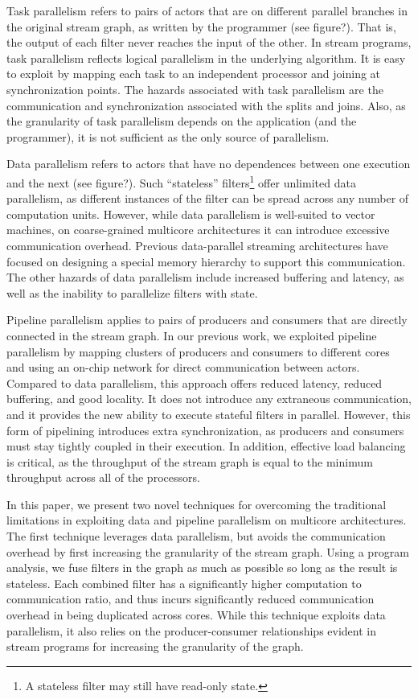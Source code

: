Task parallelism refers to pairs of actors that are on different
parallel branches in the original stream graph, as written by the
programmer (see figure?).  That is, the output of each filter never
reaches the input of the other.  In stream programs, task parallelism
reflects logical parallelism in the underlying algorithm.  It is easy
to exploit by mapping each task to an independent processor and
joining at synchronization points.  The hazards associated with task
parallelism are the communication and synchronization associated with
the splits and joins.  Also, as the granularity of task parallelism
depends on the application (and the programmer), it is not sufficient
as the only source of parallelism.

Data parallelism refers to actors that have no dependences between one
execution and the next (see figure?).  Such ``stateless''
filters\footnote{A stateless filter may still have read-only state.}
offer unlimited data parallelism, as different instances of the filter
can be spread across any number of computation units.  However, while
data parallelism is well-suited to vector machines, on coarse-grained
multicore architectures it can introduce excessive communication
overhead.  Previous data-parallel streaming architectures have focused
on designing a special memory hierarchy to support this
communication\cite{imagine}.  The other hazards of data parallelism
include increased buffering and latency, as well as the inability to
parallelize filters with state.

Pipeline parallelism applies to pairs of producers and consumers that
are directly connected in the stream graph.  In our previous work, we
exploited pipeline parallelism by mapping clusters of producers and
consumers to different cores and using an on-chip network for direct
communication between actors\cite{gordon02asplos}.  Compared to data
parallelism, this approach offers reduced latency, reduced buffering,
and good locality.  It does not introduce any extraneous
communication, and it provides the new ability to execute stateful
filters in parallel.  However, this form of pipelining introduces
extra synchronization, as producers and consumers must stay tightly
coupled in their execution.  In addition, effective load balancing is
critical, as the throughput of the stream graph is equal to the
minimum throughput across all of the processors.

In this paper, we present two novel techniques for overcoming the
traditional limitations in exploiting data and pipeline parallelism on
multicore architectures.  The first technique leverages data
parallelism, but avoids the communication overhead by first increasing
the granularity of the stream graph.  Using a program analysis, we
fuse filters in the graph as much as possible so long as the result is
stateless.  Each combined filter has a significantly higher
computation to communication ratio, and thus incurs significantly
reduced communication overhead in being duplicated across cores.
While this technique exploits data parallelism, it also relies on the
producer-consumer relationships evident in stream programs for
increasing the granularity of the graph.

